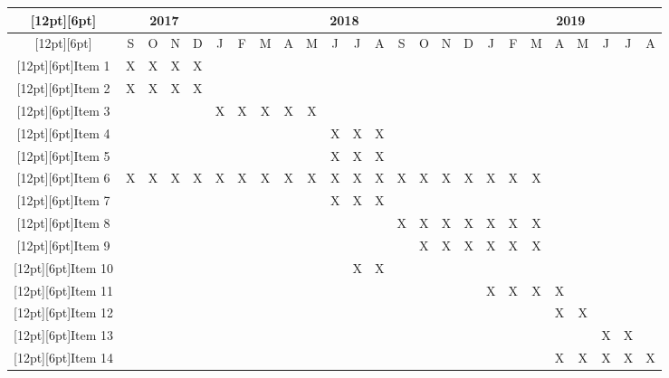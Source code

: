 \documentclass[
    12pt,                       %
    oneside,                    %
    a4paper,                    %
    brazil,                     %
    french,                     %
    spanish,                    %
    english,                    %
    ]{abntex2}
\begin{document}
\begin{landscape}
  \centering
\begin{adjustbox}{width=\textheight, totalheight=\textwidth,keepaspectratio}
\begin{tabular}{|c|c|c|c|c|c|c|c|c|c|c|c|c|c|c|c|c|c|c|c|c|c|c|c|c|}
        \hline
        \raisebox{0pt}[12pt][6pt]  & \multicolumn{4}{|c|}{2017} & \multicolumn{12}{|c|}{2018} & \multicolumn{8}{|c|}{2019} \\
        \hline
        \raisebox{0pt}[12pt][6pt]               &S&O&N&D&J&F&M&A&M&J&J&A&S&O&N&D&J&F&M&A&M&J&J&A\\
        \hline
        \raisebox{0pt}[12pt][6pt]{Item 1}       &X&X&X&X& & & & & & & & & & & & & & & & & & & & \\
        \hline
        \raisebox{0pt}[12pt][6pt]{Item 2}   &X&X&X&X& & & & & & & & & & & & & & & & & & & & \\
        \hline
        \raisebox{0pt}[12pt][6pt]{Item 3}       & & & & &X&X&X&X&X& & & & & & & & & & & & & & & \\
        \hline
        \raisebox{0pt}[12pt][6pt]{Item 4}   & & & & & & & & & &X&X&X& & & & & & & & & & & & \\
        \hline
        \raisebox{0pt}[12pt][6pt]{Item 5}   & & & & & & & & & &X&X&X& & & & & & & & & & & & \\
        \hline
        \raisebox{0pt}[12pt][6pt]{Item 6}       &X&X&X&X&X&X&X&X&X&X&X&X&X&X&X&X&X&X&X& & & & & \\
        \hline
        \raisebox{0pt}[12pt][6pt]{Item 7}       & & & & & & & & & &X&X&X& & & & & & & & & & & & \\
        \hline
        \raisebox{0pt}[12pt][6pt]{Item 8}   & & & & & & & & & & & & &X&X&X&X&X&X&X& & & & & \\
        \hline
        \raisebox{0pt}[12pt][6pt]{Item 9}   & & & & & & & & & & & & & &X&X&X&X&X&X& & & & & \\
        \hline
        \raisebox{0pt}[12pt][6pt]{Item 10}  & & & & & & & & & & &X&X& & & & & & & & & & & & \\
        \hline
        \raisebox{0pt}[12pt][6pt]{Item 11}      & & & & & & & & & & & & & & & & &X&X&X&X& & & & \\
        \hline
        \raisebox{0pt}[12pt][6pt]{Item 12}  & & & & & & & & & & & & & & & & & & & &X&X& & & \\
        \hline
        \raisebox{0pt}[12pt][6pt]{Item 13}  & & & & & & & & & & & & & & & & & & & & & &X&X& \\
        \hline
        \raisebox{0pt}[12pt][6pt]{Item 14}  & & & & & & & & & & & & & & & & & & & &X&X&X&X&X\\
        \hline
\end{tabular}
\end{adjustbox}
\end{landscape}
\end{document}
